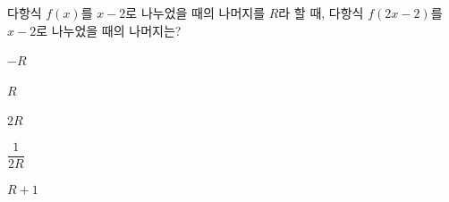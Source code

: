 다항식 $f(x)$를 $x-2$로 나누었을 때의 나머지를 $R$라 할 때, 다항식 $f(2x-2)$를 $x-2$로 나누었을 때의 나머지는? 
\begin{choices32}{\rule[-3ex]{0pt}{8ex}$-R$}{\rule[-3ex]{0pt}{8ex}$R$}{\rule[-3ex]{0pt}{8ex}$2R$}{\rule[-3ex]{0pt}{8ex}$\dfrac{1}{2R}$}{\rule[-3ex]{0pt}{8ex}$R+1$}\end{choices32}
